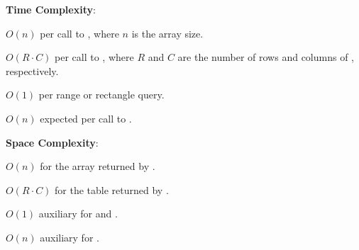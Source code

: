 \textbf{Time Complexity}:
\begin{compactitem}
  \item $O(n)$ per call to , where $n$ is the array size.
  \item $O(R \cdot C)$ per call to , where $R$ and $C$ are the number of rows and columns of , respectively.
  \item $O(1)$ per range or rectangle query.
  \item $O(n)$ expected per call to .
\end{compactitem}

\textbf{Space Complexity}:
\begin{compactitem}
  \item $O(n)$ for the array returned by .
  \item $O(R \cdot C)$ for the table returned by .
  \item $O(1)$ auxiliary for  and .
  \item $O(n)$ auxiliary for .
\end{compactitem}

